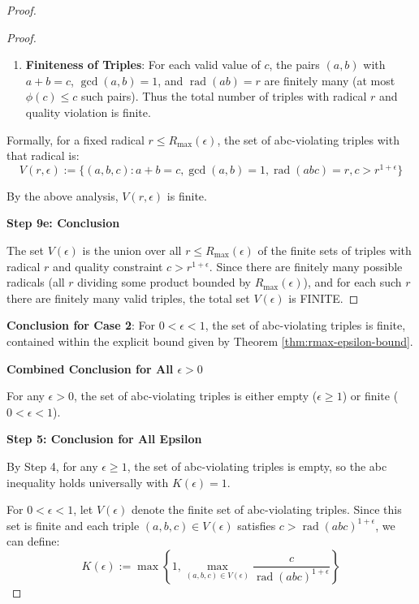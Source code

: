 \begin{proof}
\begin{proof}
\begin{enumerate}
The constraint $c > r^{1+\epsilon}$ determines which exponent combinations are valid. Combined with the bound $\sum v_q \leq \frac{\log R_{\max}(\epsilon)}{\log 2}$, these constraints define a finite set of possible $c$ values.

\item \textbf{Finiteness of Triples}: For each valid value of $c$, the pairs $(a, b)$ with $a + b = c$, $\gcd(a, b) = 1$, and $\operatorname{rad}(ab) = r$ are finitely many (at most $\phi(c) \leq c$ such pairs). Thus the total number of triples with radical $r$ and quality violation is finite.
\end{enumerate}

Formally, for a fixed radical $r \leq R_{\max}(\epsilon)$, the set of abc-violating triples with that radical is:
\begin{equation}
V(r, \epsilon) := \{(a,b,c) : a+b=c, \gcd(a,b)=1, \operatorname{rad}(abc) = r, c > r^{1+\epsilon}\}
\end{equation}

By the above analysis, $V(r, \epsilon)$ is finite.

\noindent \textbf{Step 9e: Conclusion}

The set $V(\epsilon)$ is the union over all $r \leq R_{\max}(\epsilon)$ of the finite sets of triples with radical $r$ and quality constraint $c > r^{1+\epsilon}$. Since there are finitely many possible radicals (all $r$ dividing some product bounded by $R_{\max}(\epsilon)$), and for each such $r$ there are finitely many valid triples, the total set $V(\epsilon)$ is FINITE.

\end{proof}

\noindent \textbf{Conclusion for Case 2}: For $0 < \epsilon < 1$, the set of abc-violating triples is finite, contained within the explicit bound given by Theorem \ref{thm:rmax-epsilon-bound}.

\noindent \textbf{Combined Conclusion for All $\epsilon > 0$}

For any $\epsilon > 0$, the set of abc-violating triples is either empty ($\epsilon \geq 1$) or finite ($0 < \epsilon < 1$).

\noindent \textbf{Step 5: Conclusion for All Epsilon}

By Step 4, for any $\epsilon \geq 1$, the set of abc-violating triples is empty, so the abc inequality holds universally with $K(\epsilon) = 1$.

For $0 < \epsilon < 1$, let $V(\epsilon)$ denote the finite set of abc-violating triples. Since this set is finite and each triple $(a,b,c) \in V(\epsilon)$ satisfies $c > \operatorname{rad}(abc)^{1+\epsilon}$, we can define:
\begin{equation}
K(\epsilon) := \max\left\{1, \max_{(a,b,c) \in V(\epsilon)} \frac{c}{\operatorname{rad}(abc)^{1+\epsilon}}\right\}
\end{equation}


\end{proof}
